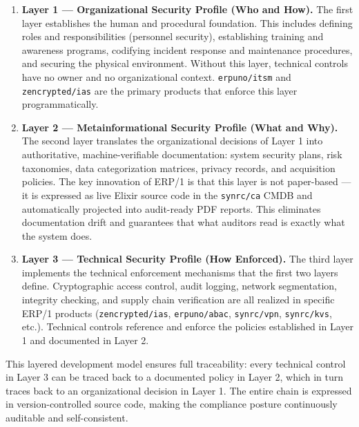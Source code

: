 \documentclass{article}
\begin{document}
\begin{enumerate}

    \item \textbf{Layer 1 --- Organizational Security Profile (Who and How).}
    The first layer establishes the human and procedural foundation. This includes defining roles and
    responsibilities (personnel security), establishing training and awareness programs, codifying
    incident response and maintenance procedures, and securing the physical environment. Without this layer,
    technical controls have no owner and no organizational context. \texttt{erpuno/itsm} and \texttt{zencrypted/ias} are
    the primary products that enforce this layer programmatically.

    \item \textbf{Layer 2 --- Metainformational Security Profile (What and Why).}
    The second layer translates the organizational decisions of Layer 1 into authoritative,
    machine-verifiable documentation: system security plans, risk taxonomies, data categorization matrices,
    privacy records, and acquisition policies. The key innovation of ERP/1 is that this layer is not paper-based ---
    it is expressed as live Elixir source code in the \texttt{synrc/ca} CMDB and automatically projected into
    audit-ready PDF reports. This eliminates documentation drift and guarantees that what auditors read is
    exactly what the system does.

    \item \textbf{Layer 3 --- Technical Security Profile (How Enforced).}
    The third layer implements the technical enforcement mechanisms that the first two layers define.
    Cryptographic access control, audit logging, network segmentation, integrity checking, and supply
    chain verification are all realized in specific ERP/1 products (\texttt{zencrypted/ias}, \texttt{erpuno/abac},
    \texttt{synrc/vpn}, \texttt{synrc/kvs}, etc.). Technical controls reference and enforce the policies
    established in Layer 1 and documented in Layer 2.

\end{enumerate}

This layered development model ensures full traceability: every technical control in Layer 3 can be traced back
to a documented policy in Layer 2, which in turn traces back to an organizational decision in Layer 1.
The entire chain is expressed in version-controlled source code, making the compliance posture continuously auditable and self-consistent.
\end{document}
